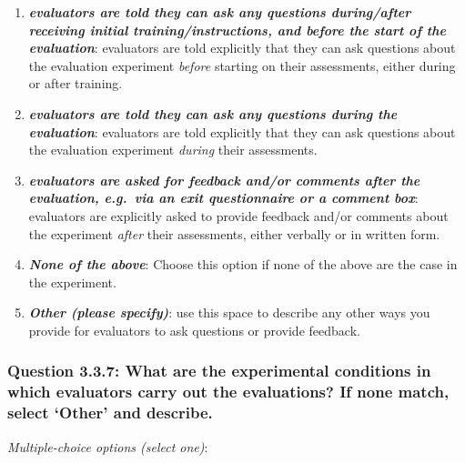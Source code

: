 \documentclass[11pt,a4paper]{article}
\newcommand{\egcvalue}[1]{\textbf{\textit{#1}}}
\begin{document}
\begin{enumerate}[itemsep=0cm,leftmargin=0.5cm,label={\small $\square$}]
    \item \egcvalue{evaluators are told they can ask any questions during/after receiving initial training/instructions, and before the start of the evaluation}: evaluators are told explicitly that they can ask  questions about the evaluation experiment \textit{before} starting on their assessments, either during or after training.
    \item \egcvalue{evaluators are told they can ask any questions during the evaluation}: evaluators are told explicitly that they can ask  questions about the evaluation experiment \textit{during} their assessments.
    \item \egcvalue{evaluators are asked for feedback and/or comments after the evaluation, e.g.\ via an exit questionnaire or a comment box}: evaluators are explicitly asked to provide feedback and/or comments about the experiment \textit{after} their assessments, either verbally or in written form.
    \item \egcvalue{None of the above}: Choose this option if none of the above are the case in the experiment.
    \item \egcvalue{Other (please specify)}: use this space to describe any other ways you provide for evaluators to ask questions or provide feedback.
\end{enumerate}

\subsubsection*{Question 3.3.7: What are the experimental conditions in which evaluators carry out the evaluations? If none match, select `Other’ and describe.}

\noindent\textit{Multiple-choice options (select one)}:  
\vspace{-.1cm}
\end{document}
